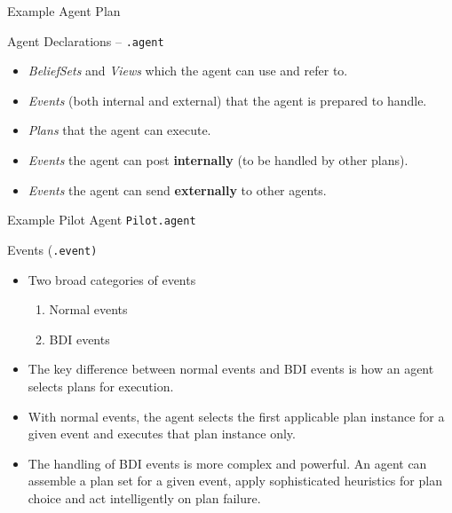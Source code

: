 \documentclass[aspectratio=1610,xcolor=dvipsnames,t]{beamer}
\newcommand{\showcode}[1]{\begin{mdframed}[style=code] %
                          \end{mdframed}%
}
\begin{document}
\begin{frame}{Example Agent Plan} 
    \showcode{robotplan.java} 
\end{frame} 

\begin{frame}{Agent Declarations -- \texttt{.agent}} 
    \begin{itemize}
        \item \emph{BeliefSets} and \emph{Views} which the agent can use and refer to. 
        \item \emph{Events} (both internal and external) that the 
               agent is prepared to handle. 
        \item \emph{Plans} that the agent can execute. 
        \item \emph{Events} the agent can post \textbf{internally} 
               (to be handled by other plans). 
        \item \emph{Events} the agent can send \textbf{externally} to other agents. 
    \end{itemize}
\end{frame} 

\begin{frame}{Example Pilot Agent \texttt{Pilot.agent}}
    \showcode{pilotagent.java} 
\end{frame} 

\begin{frame}{Events (\texttt{.event)} }
    \begin{itemize}
        \item Two broad categories of events
            \begin{enumerate}
                \item Normal events
                \item BDI events
            \end{enumerate} 

        \item The key difference between normal events and 
              BDI events is how an agent selects plans for execution.

        \item With normal events, the agent selects the first 
              applicable plan instance for a given event and executes 
              that plan instance only. 

        \item The handling of BDI events is more complex and powerful. 
              An agent can assemble a plan set for a given event, 
              apply sophisticated heuristics for plan choice and 
              act intelligently on plan failure. 
    \end{itemize} 
\end{frame} 
\end{document}

